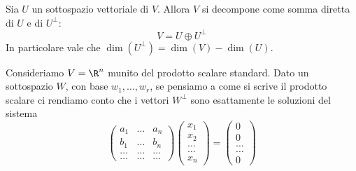 \begin{theorem}
	Sia $U$ un sottospazio vettoriale di $V$. Allora $V$ si decompone come
	somma diretta di $U$ e di $U^\perp$:
	\[
		V = U \oplus U^\perp
	\]
	In particolare vale che $\dim(U^\perp) = \dim(V) - \dim(U)$.
\end{theorem}

\begin{observation}
	Consideriamo $V = \R^n$ munito del prodotto scalare standard. Dato
	un sottospazio $W$, con base $w_1, \dots, w_r$, se pensiamo a come si
	scrive il prodotto scalare ci rendiamo conto che i vettori $W^\perp$ sono
	esattamente le soluzioni del sistema
	\[
		\begin{pmatrix}
			a_1   & \dots & a_n   \\
			b_1   & \dots & b_n   \\
			\dots & \dots & \dots \\
			\dots & \dots & \dots
		\end{pmatrix}
		\begin{pmatrix}
			x_1 \\ x_2 \\ \dots \\ \dots \\ x_n
		\end{pmatrix} =
		\begin{pmatrix}
			0 \\ 0 \\ \dots \\ \dots \\ 0
		\end{pmatrix}
	\]
\end{observation}